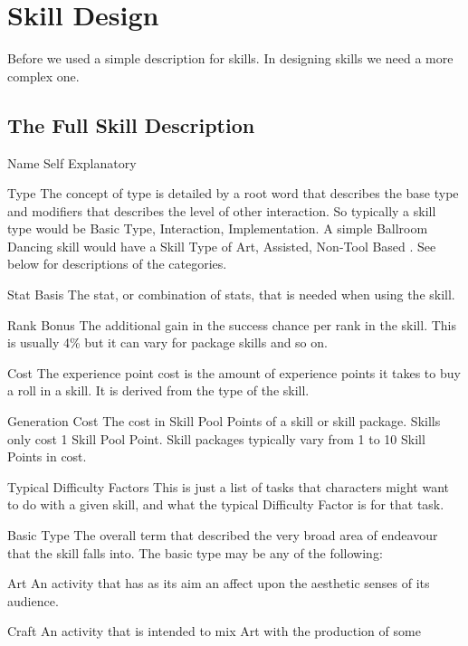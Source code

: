 \chapter{Skill Design}

Before we used a simple description for skills. In designing skills we need
a more complex one.

\section{The Full Skill Description}
\small

\begin{relate}
	\item[Name] Self Explanatory
	\item[Type] The concept of type is detailed by a root word that describes the base
	type and modifiers that describes the level of other interaction. So
	typically a skill type would be Basic Type, Interaction, Implementation.
	A simple Ballroom Dancing skill would have a Skill Type of
	Art, Assisted, Non-Tool Based . See below for descriptions of the
	categories.
	\item[Stat Basis] The stat, or combination of stats, that is needed
	when using the skill.
	\item[Rank Bonus] The additional gain in the success chance per rank
	in the skill. This is usually 4\% but it can vary for package skills
	and so on.
	\item[Cost]	The experience point cost is the amount of experience points it takes to
	buy a roll in a skill. It is derived from the type of the skill.
	\item[Generation Cost]
	The cost in Skill Pool Points of a skill or skill package. Skills
	only cost 1 Skill Pool Point. Skill packages typically vary from 1
	to 10 Skill Points in cost.
	\item[Typical Difficulty Factors]
	This is just a list of tasks that characters might want to do with a
	given skill, and what the typical Difficulty Factor is for that task.
	\item[Basic Type]
	The overall term that described the very broad area of
	endeavour that the skill falls into. The basic type may be any of the
	following:
	\begin{relate}
		\item[Art]
		An activity that has as its aim an affect upon the aesthetic senses of its
		audience.
		\item[Craft]
		An activity that is intended to mix Art with the production of some

\end{relate}
\end{relate}
